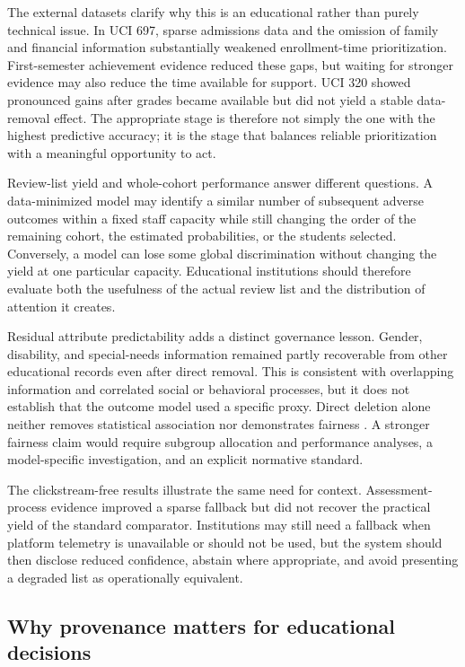 \documentclass[education,article,submit,moreauthors]{Definitions/mdpi}
\begin{document}
The external datasets clarify why this is an educational rather than purely technical issue. In UCI 697, sparse admissions data and the omission of family and financial information substantially weakened enrollment-time prioritization. First-semester achievement evidence reduced these gaps, but waiting for stronger evidence may also reduce the time available for support. UCI 320 showed pronounced gains after grades became available but did not yield a stable data-removal effect. The appropriate stage is therefore not simply the one with the highest predictive accuracy; it is the stage that balances reliable prioritization with a meaningful opportunity to act.

Review-list yield and whole-cohort performance answer different questions. A data-minimized model may identify a similar number of subsequent adverse outcomes within a fixed staff capacity while still changing the order of the remaining cohort, the estimated probabilities, or the students selected. Conversely, a model can lose some global discrimination without changing the yield at one particular capacity. Educational institutions should therefore evaluate both the usefulness of the actual review list and the distribution of attention it creates.

Residual attribute predictability adds a distinct governance lesson. Gender, disability, and special-needs information remained partly recoverable from other educational records even after direct removal. This is consistent with overlapping information and correlated social or behavioral processes, but it does not establish that the outcome model used a specific proxy. Direct deletion alone neither removes statistical association nor demonstrates fairness \citep{gardner2019fairness,pham2025fairness}. A stronger fairness claim would require subgroup allocation and performance analyses, a model-specific investigation, and an explicit normative standard.

The clickstream-free results illustrate the same need for context. Assessment-process evidence improved a sparse fallback but did not recover the practical yield of the standard comparator. Institutions may still need a fallback when platform telemetry is unavailable or should not be used, but the system should then disclose reduced confidence, abstain where appropriate, and avoid presenting a degraded list as operationally equivalent.

\subsection{Why provenance matters for educational decisions}
\end{document}
